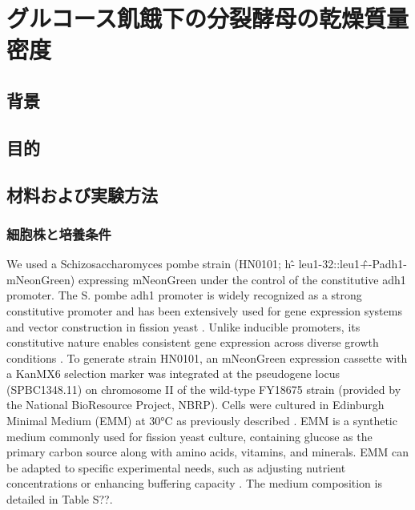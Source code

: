 \chapter{グルコース飢餓下の分裂酵母の乾燥質量密度}

\section{背景}

\section{目的}

\section{材料および実験方法}

\subsection{細胞株と培養条件}
We used a Schizosaccharomyces pombe strain (HN0101; h\^- leu1-32::leu1\^+-Padh1-mNeonGreen) expressing mNeonGreen under the control of the constitutive adh1 promoter. The S. pombe adh1 promoter is widely recognized as a strong constitutive promoter and has been extensively used for gene expression systems and vector construction in fission yeast \cite{verma2014high, grimm1991strong, forsburg1993comparison}. Unlike inducible promoters, its constitutive nature enables consistent gene expression across diverse growth conditions \cite{matsuyama2008series}.
To generate strain HN0101, an mNeonGreen expression cassette with a KanMX6 selection marker was integrated at the pseudogene locus (SPBC1348.11) on chromosome II of the wild-type FY18675 strain (provided by the National BioResource Project, NBRP). Cells were cultured in Edinburgh Minimal Medium (EMM) at 30°C as previously described \cite{moreno1991molecular}. EMM is a synthetic medium commonly used for fission yeast culture, containing glucose as the primary carbon source along with amino acids, vitamins, and minerals. EMM can be adapted to specific experimental needs, such as adjusting nutrient concentrations or enhancing buffering capacity \cite{petersen2016growth}. The medium composition is detailed in Table S??.


